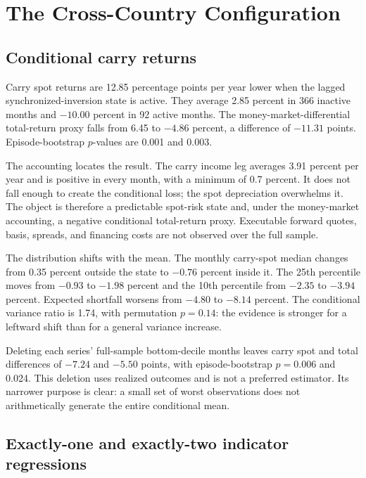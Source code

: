 \section{The Cross-Country Configuration}
\label{sec:main_evidence}

\subsection{Conditional carry returns}

Carry spot returns are 12.85 percentage points per year lower when the lagged synchronized-inversion state is active. They average 2.85 percent in 366 inactive months and $-10.00$ percent in 92 active months. The money-market-differential total-return proxy falls from 6.45 to $-4.86$ percent, a difference of $-11.31$ points. Episode-bootstrap $p$-values are 0.001 and 0.003.



The accounting locates the result. The carry income leg averages 3.91 percent per year and is positive in every month, with a minimum of 0.7 percent. It does not fall enough to create the conditional loss; the spot depreciation overwhelms it. The object is therefore a predictable spot-risk state and, under the money-market accounting, a negative conditional total-return proxy. Executable forward quotes, basis, spreads, and financing costs are not observed over the full sample.

The distribution shifts with the mean. The monthly carry-spot median changes from 0.35 percent outside the state to $-0.76$ percent inside it. The 25th percentile moves from $-0.93$ to $-1.98$ percent and the 10th percentile from $-2.35$ to $-3.94$ percent. Expected shortfall worsens from $-4.80$ to $-8.14$ percent. The conditional variance ratio is 1.74, with permutation $p=0.14$: the evidence is stronger for a leftward shift than for a general variance increase.

Deleting each series' full-sample bottom-decile months leaves carry spot and total differences of $-7.24$ and $-5.50$ points, with episode-bootstrap $p=0.006$ and 0.024. This deletion uses realized outcomes and is not a preferred estimator. Its narrower purpose is clear: a small set of worst observations does not arithmetically generate the entire conditional mean.

\subsection{Exactly-one and exactly-two indicator regressions}

